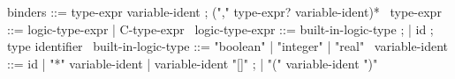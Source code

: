 \begin{syntax}
  binders ::= type-expr variable-ident ;
  ("," type-expr? variable-ident)*
  \
  type-expr ::= logic-type-expr | C-type-expr
  \
  logic-type-expr ::= built-in-logic-type ;
  | id ; type identifier
  \
  built-in-logic-type ::= "boolean" | "integer" | "real" 
  \
  variable-ident ::= id 
  | "*" variable-ident 
  | variable-ident "[]" ;
  | "(" variable-ident ")"
\end{syntax}